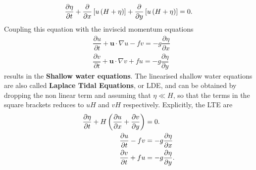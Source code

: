 \begin{equation}
\dfrac{\partial \eta}{\partial t}+\dfrac{\partial}{\partial x}\left[ u\left( H+\eta \right) \right]+\dfrac{\partial}{\partial y}\left[ u\left( H+\eta \right) \right]=0.
\end{equation}
Coupling this equation with the inviscid momentum equations
\begin{align}
&\dfrac{\partial u}{\partial t}+\mathbf{u}\cdot\nabla u-fv=-g\dfrac{\partial \eta}{\partial x}\\
&\dfrac{\partial v}{\partial t}+\mathbf{u}\cdot\nabla v+fu=-g\dfrac{\partial \eta}{\partial y}
\end{align}
results in the \textbf{Shallow water equations}. The linearised shallow water equations are also called \textbf{Laplace Tidal Equations}, or LDE, and can be obtained by dropping the non linear term and assuming that $\eta\ll H$, so that the terms in the square brackets reduces to $uH$ and $vH$ respectively. Explicitly, the LTE are
\begin{align}
\dfrac{\partial \eta}{\partial t}+H\left( \dfrac{\partial u}{\partial x}+\dfrac{\partial v}{\partial y} \right)&=0.\\
\dfrac{\partial u}{\partial t}-fv&=-g\dfrac{\partial \eta}{\partial x}\\
\dfrac{\partial v}{\partial t}+fu&=-g\dfrac{\partial \eta}{\partial y}.
\end{align}
